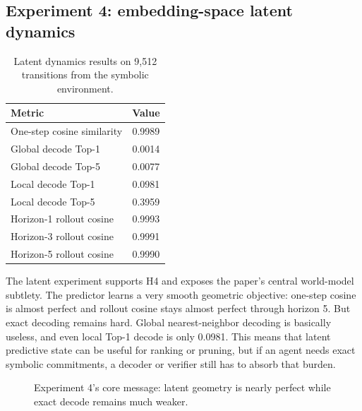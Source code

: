 \documentclass[11pt]{article}
\begin{document}
\subsection{Experiment 4: embedding-space latent dynamics}
\begin{table}[t]
    \centering
    \caption{Latent dynamics results on 9,512 transitions from the symbolic environment.}
    \begin{tabular}{lc}
        \toprule
        Metric & Value \\
        \midrule
        One-step cosine similarity & 0.9989 \\
        Global decode Top-1 & 0.0014 \\
        Global decode Top-5 & 0.0077 \\
        Local decode Top-1 & 0.0981 \\
        Local decode Top-5 & 0.3959 \\
        Horizon-1 rollout cosine & 0.9993 \\
        Horizon-3 rollout cosine & 0.9991 \\
        Horizon-5 rollout cosine & 0.9990 \\
        \bottomrule
    \end{tabular}
    \label{tab:latent}
\end{table}

The latent experiment supports H4 and exposes the paper's central world-model subtlety. The predictor learns a very smooth geometric objective: one-step cosine is almost perfect and rollout cosine stays almost perfect through horizon 5. But exact decoding remains hard. Global nearest-neighbor decoding is basically useless, and even local Top-1 decode is only 0.0981. This means that latent predictive state can be useful for ranking or pruning, but if an agent needs exact symbolic commitments, a decoder or verifier still has to absorb that burden.

\begin{figure}[t]
\centering
{}
\caption{Experiment 4's core message: latent geometry is nearly perfect while exact decode remains much weaker.}
\label{fig:latent-gap}
\end{figure}
\end{document}
